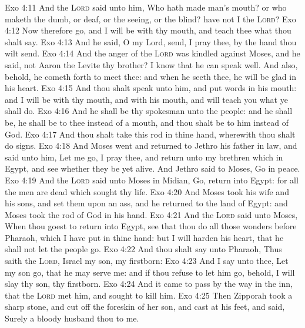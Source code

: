 \vs Exo 4:11 And the \textsc{Lord} said unto him, Who hath made man's mouth? or who maketh the dumb, or deaf, or the seeing, or the blind? have not I the \textsc{Lord}?
\vs Exo 4:12 Now therefore go, and I will be with thy mouth, and teach thee what thou shalt say.
\vs Exo 4:13 And he said, O my Lord, send, I pray thee, by the hand  thou wilt send.
\vs Exo 4:14 And the anger of the \textsc{Lord} was kindled against Moses, and he said,  not Aaron the Levite thy brother? I know that he can speak well. And also, behold, he cometh forth to meet thee: and when he seeth thee, he will be glad in his heart.
\vs Exo 4:15 And thou shalt speak unto him, and put words in his mouth: and I will be with thy mouth, and with his mouth, and will teach you what ye shall do.
\vs Exo 4:16 And he shall be thy spokesman unto the people: and he shall be,  he shall be to thee instead of a mouth, and thou shalt be to him instead of God.
\vs Exo 4:17 And thou shalt take this rod in thine hand, wherewith thou shalt do signs.
\vs Exo 4:18 And Moses went and returned to Jethro his father in law, and said unto him, Let me go, I pray thee, and return unto my brethren which  in Egypt, and see whether they be yet alive. And Jethro said to Moses, Go in peace.
\vs Exo 4:19 And the \textsc{Lord} said unto Moses in Midian, Go, return into Egypt: for all the men are dead which sought thy life.
\vs Exo 4:20 And Moses took his wife and his sons, and set them upon an ass, and he returned to the land of Egypt: and Moses took the rod of God in his hand.
\vs Exo 4:21 And the \textsc{Lord} said unto Moses, When thou goest to return into Egypt, see that thou do all those wonders before Pharaoh, which I have put in thine hand: but I will harden his heart, that he shall not let the people go.
\vs Exo 4:22 And thou shalt say unto Pharaoh, Thus saith the \textsc{Lord}, Israel  my son,  my firstborn:
\vs Exo 4:23 And I say unto thee, Let my son go, that he may serve me: and if thou refuse to let him go, behold, I will slay thy son,  thy firstborn.
\vs Exo 4:24 And it came to pass by the way in the inn, that the \textsc{Lord} met him, and sought to kill him.
\vs Exo 4:25 Then Zipporah took a sharp stone, and cut off the foreskin of her son, and cast  at his feet, and said, Surely a bloody husband  thou to me.
